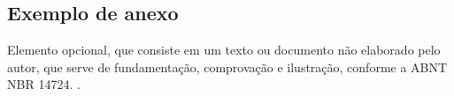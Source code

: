 \begin{anexosenv}

\partanexos

\chapter{Exemplo de anexo}
Elemento opcional, que consiste em um texto ou documento não elaborado pelo autor, que serve de fundamentação, comprovação e ilustração, conforme a ABNT NBR 14724. \cite{nbr14724}.

\end{anexosenv}
